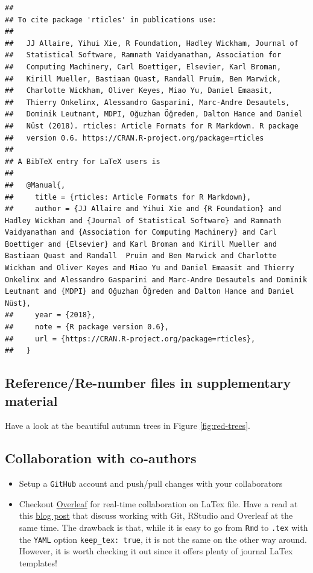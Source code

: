 \documentclass[12pt,]{article}
\providecommand{\tightlist}{%
  \setlength{\itemsep}{0pt}\setlength{\parskip}{0pt}}
\begin{document}
\begin{verbatim}
## 
## To cite package 'rticles' in publications use:
## 
##   JJ Allaire, Yihui Xie, R Foundation, Hadley Wickham, Journal of
##   Statistical Software, Ramnath Vaidyanathan, Association for
##   Computing Machinery, Carl Boettiger, Elsevier, Karl Broman,
##   Kirill Mueller, Bastiaan Quast, Randall Pruim, Ben Marwick,
##   Charlotte Wickham, Oliver Keyes, Miao Yu, Daniel Emaasit,
##   Thierry Onkelinx, Alessandro Gasparini, Marc-Andre Desautels,
##   Dominik Leutnant, MDPI, Oğuzhan Öğreden, Dalton Hance and Daniel
##   Nüst (2018). rticles: Article Formats for R Markdown. R package
##   version 0.6. https://CRAN.R-project.org/package=rticles
## 
## A BibTeX entry for LaTeX users is
## 
##   @Manual{,
##     title = {rticles: Article Formats for R Markdown},
##     author = {JJ Allaire and Yihui Xie and {R Foundation} and Hadley Wickham and {Journal of Statistical Software} and Ramnath  Vaidyanathan and {Association for Computing Machinery} and Carl Boettiger and {Elsevier} and Karl Broman and Kirill Mueller and Bastiaan Quast and Randall  Pruim and Ben Marwick and Charlotte Wickham and Oliver Keyes and Miao Yu and Daniel Emaasit and Thierry Onkelinx and Alessandro Gasparini and Marc-Andre Desautels and Dominik Leutnant and {MDPI} and Oğuzhan Öğreden and Dalton Hance and Daniel Nüst},
##     year = {2018},
##     note = {R package version 0.6},
##     url = {https://CRAN.R-project.org/package=rticles},
##   }
\end{verbatim}

\subsection{Reference/Re-number files in supplementary
material}\label{referencere-number-files-in-supplementary-material}

Have a look at the beautiful autumn trees in Figure \ref{fig:red-trees}.

\subsection{Collaboration with
co-authors}\label{collaboration-with-co-authors}

\begin{itemize}
\tightlist
\item
  Setup a \texttt{GitHub} account and push/pull changes with your
  collaborators
\item
  Checkout \href{https://www.overleaf.com/}{Overleaf} for real-time
  collaboration on LaTex file. Have a read at this
  \href{https://medium.com/@arinbasu/a-tutorial-on-how-to-interface-an-r-notebook-with-overleaf-11f23c306cfd}{blog
  post} that discuss working with Git, RStudio and Overleaf at the same
  time. The drawback is that, while it is easy to go from \texttt{Rmd}
  to \texttt{.tex} with the \texttt{YAML} option
  \texttt{keep\_tex:\ true}, it is not the same on the other way around.
  However, it is worth checking it out since it offers plenty of journal
  LaTex templates!
\end{itemize}
\end{document}
